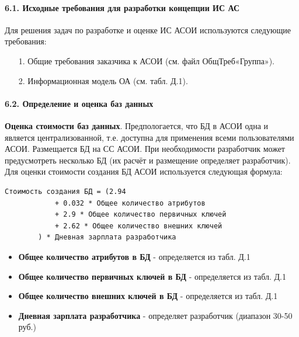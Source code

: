 \documentclass[12pt, a4paper, simple]{eskdtext}
\begin{document}
    \paragraph{6.1. Исходные требования для разработки концепции ИС АС} \hspace{0pt}

    Для решения задач по разработке и оценке ИС АСОИ используются следующие требования:
    
    \begin{enumerate}
        \item[1.] Общие требования заказчика к АСОИ (см. файл ОбщТреб«Группа»).
        \item[2.] Информационная модель ОА (см. табл. Д.1).
    \end{enumerate}

    \paragraph{6.2. Определение и оценка баз данных} \hspace{0pt}

    \textbf{Оценка стоимости баз данных}.
    Предпологается, что БД в АСОИ одна и является централизованной,
    т.е. доступна для применения всеми пользователями АСОИ.
    Размещается БД на СС АСОИ.
    При необходимости разработчик может предусмотреть несколько БД
    (их расчёт и размещение определяет разработчик).
    Для оценки стоимости создания БД АСОИ используется следующая формула:

    \begin{lstlisting}[language=Formula]
        Стоимость создания БД = (2.94
            + 0.032 * Общее количество атрибутов
            + 2.9 * Общее количество первичных ключей
            + 2.62 * Общее количество внешних ключей
        ) * Дневная зарплата разработчика
\end{lstlisting}
 
    \begin{itemize}
        \item \textbf{Общее количество атрибутов в БД} - определяется из табл. Д.1
        \item \textbf{Общее количество первичных ключей в БД} - определяется из табл. Д.1
        \item \textbf{Общее количество внешних ключей в БД} - определяется из табл. Д.1
        \item \textbf{Дневная зарплата разработчика} - определяет разработчик (диапазон 30-50 руб.)
    \end{itemize}
\end{document}
